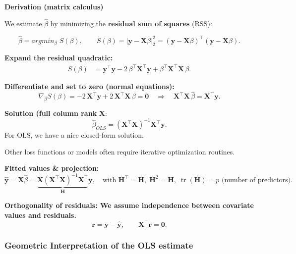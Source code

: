 \documentclass[
  letterpaper,
  DIV=11,
  numbers=noendperiod]{scrreprt}
\begin{document}
\begin{tcolorbox}[enhanced jigsaw, rightrule=.15mm, breakable, left=2mm, colframe=quarto-callout-tip-color-frame, opacityback=0, leftrule=.75mm, toprule=.15mm, colback=white, arc=.35mm, bottomrule=.15mm]

\textbf{Derivation (matrix calculus)}\vspace{2mm}

We estimate \(\hat\beta\) by minimizing the \textbf{residual sum of
squares} (RSS):

\[
\hat\beta = argmin_{\beta}\; S(\beta),
\qquad
S(\beta)=|\mathbf{y}-\mathbf{X}\beta|_2^2
=(\mathbf{y}-\mathbf{X}\beta)^\top(\mathbf{y}-\mathbf{X}\beta).
\]

\textbf{Expand the residual quadratic:} \[
\begin{aligned}
S(\beta)
&= \mathbf{y}^\top\mathbf{y}
 - 2\,\beta^\top\mathbf{X}^\top\mathbf{y}
 + \beta^\top\mathbf{X}^\top\mathbf{X}\,\beta.
\end{aligned}
\]

\textbf{Differentiate and set to zero (normal equations):} \[
\nabla_\beta S(\beta)
= -2\,\mathbf{X}^\top\mathbf{y}
 + 2\,\mathbf{X}^\top\mathbf{X}\,\beta
= \mathbf{0}
\quad\Longrightarrow\quad
\mathbf{X}^\top\mathbf{X}\,\hat\beta
= \mathbf{X}^\top\mathbf{y}.
\]

\textbf{Solution (full column rank} \(\mathbf{X}\): \[
\hat\beta_{OLS}
= (\mathbf{X}^\top\mathbf{X})^{-1}\mathbf{X}^\top\mathbf{y}.
\] For OLS, we have a nice closed-form solution.

Other loss functions or models often require iterative optimization
routines.

\textbf{Fitted values \& projection:} \[
 \hat{\mathbf{y}}=\mathbf{X}\hat\beta
= \underbrace{\mathbf{X}(\mathbf{X}^\top\mathbf{X})^{-1}\mathbf{X}^\top}_{\mathbf{H}}\mathbf{y},
\quad
\text{with }\mathbf{H}^\top=\mathbf{H},\;\mathbf{H}^2=\mathbf{H},\;\operatorname{tr}(\mathbf{H})=p \text{ (number of predictors)}.
\]

\textbf{Orthogonality of residuals: We assume independence between
covariate values and residuals.} \[
\mathbf{r}=\mathbf{y}-\hat{\mathbf{y}},\qquad
\mathbf{X}^\top\mathbf{r}=\mathbf{0}.
\]

\end{tcolorbox}

\hypertarget{geometric-interpretation-of-the-ols-estimate}{%
\subsubsection*{Geometric Interpretation of the OLS
estimate}\label{geometric-interpretation-of-the-ols-estimate}}
\end{document}
